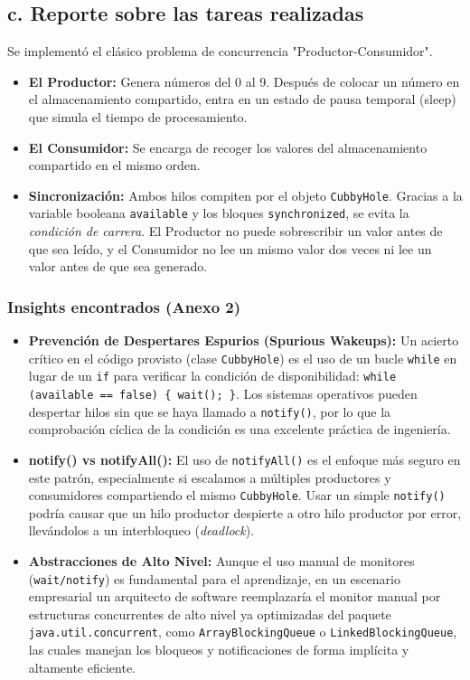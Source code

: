\documentclass{article}
\begin{document}
    \subsection{c. Reporte sobre las tareas realizadas}
    Se implementó el clásico problema de concurrencia "Productor-Consumidor". 
    \begin{itemize}
        \item \textbf{El Productor:} Genera números del 0 al 9. Después de colocar un número en el almacenamiento compartido, entra en un estado de pausa temporal (sleep) que simula el tiempo de procesamiento.
        \item \textbf{El Consumidor:} Se encarga de recoger los valores del almacenamiento compartido en el mismo orden.
        \item \textbf{Sincronización:} Ambos hilos compiten por el objeto \texttt{CubbyHole}. Gracias a la variable booleana \texttt{available} y los bloques \texttt{synchronized}, se evita la \textit{condición de carrera}. El Productor no puede sobrescribir un valor antes de que sea leído, y el Consumidor no lee un mismo valor dos veces ni lee un valor antes de que sea generado.
    \end{itemize}

    \subsubsection*{Insights encontrados (Anexo 2)}
    \begin{itemize}
        \item \textbf{Prevención de Despertares Espurios (Spurious Wakeups):} Un acierto crítico en el código provisto (clase \texttt{CubbyHole}) es el uso de un bucle \texttt{while} en lugar de un \texttt{if} para verificar la condición de disponibilidad: \texttt{while (available == false) \{ wait(); \}}. Los sistemas operativos pueden despertar hilos sin que se haya llamado a \texttt{notify()}, por lo que la comprobación cíclica de la condición es una excelente práctica de ingeniería.
        \item \textbf{notify() vs notifyAll():} El uso de \texttt{notifyAll()} es el enfoque más seguro en este patrón, especialmente si escalamos a múltiples productores y consumidores compartiendo el mismo \texttt{CubbyHole}. Usar un simple \texttt{notify()} podría causar que un hilo productor despierte a otro hilo productor por error, llevándolos a un interbloqueo (\textit{deadlock}). 
        \item \textbf{Abstracciones de Alto Nivel:} Aunque el uso manual de monitores (\texttt{wait/notify}) es fundamental para el aprendizaje, en un escenario empresarial un arquitecto de software reemplazaría el monitor manual por estructuras concurrentes de alto nivel ya optimizadas del paquete \texttt{java.util.concurrent}, como \texttt{ArrayBlockingQueue} o \texttt{LinkedBlockingQueue}, las cuales manejan los bloqueos y notificaciones de forma implícita y altamente eficiente.
    \end{itemize}
\end{document}
